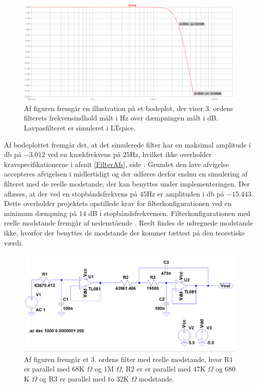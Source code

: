 \begin{figure}[H]
	\centering
	\includegraphics[scale=0.4]{figures/cProblemloesning/Lavpasfiltergraf_LTspice1.PNG}
	\caption{Af figuren fremgår en illustration på et bodeplot, der viser 3. ordens filterets frekvensindhold målt i Hz over dæmpningen målt i dB. Lavpasfilteret er simuleret i LTspice.}
	\label{fig:lavpasfiltergraf_LTspice1}
\end{figure}
\noindent Af bodeplottet fremgår det, at det simulerede filter har en maksimal amplitude i db på $-3.012$ ved en knækfrekvens på $25$Hz, hvilket ikke overholder kravspecifikationerne i afsnit \ref{FilterAfs}, side \pageref{FilterAfs}. Grundet den lave afvigelse accepteres afvigelsen i midlertidigt og der udføres derfor endnu en simulering af filteret med de reelle modstande, der kan benyttes under implementeringen. Der aflæses, at der ved en stopbåndsfrekvens på $45$Hz er amplituden i db på $-15.443$. Dette overholder projektets opstillede krav for filterkonfigurationen ved en minimum dæmpning på $14$ dB i stopbåndsfrekvensen. Filterkonfigurationen med reelle modstande fremgår af nedenstående . Reelt findes de udregnede modstande ikke, hvorfor der benyttes de modstande der kommer tættest på den teoretiske værdi. 

\begin{figure}[H]
	\centering
	\includegraphics[scale=0.4]{figures/cProblemloesning/Sim_reel_modstande.PNG}
	\caption{Af figuren fremgår et 3. ordens filter med reelle modstande, hvor R$1$ er parallel med $68$K $\Omega$ og $1$M $\Omega$, R$2$ er er parallel med $47$K $\Omega$ og $680$K $\Omega$ og R$3$ er parallel med to $32$K $\Omega$ modstande.}
	\label{fig:Sim_reel_modstande}
\end{figure}

